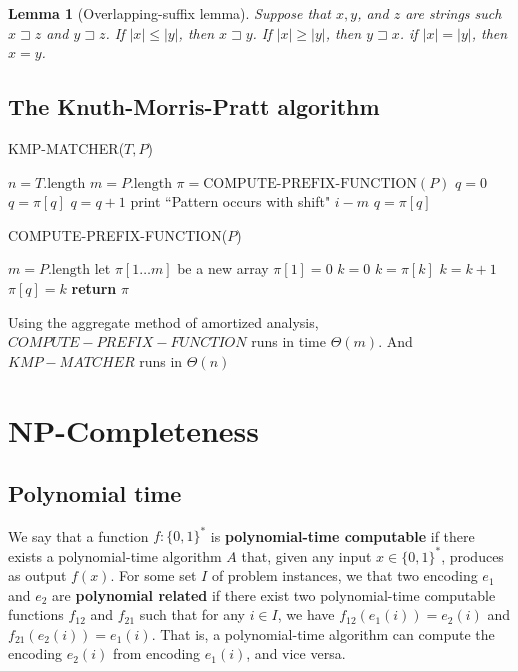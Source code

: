 \documentclass[12pt]{article}
\newtheorem{lemma}[theorem]{Lemma}
\begin{document}
\begin{lemma} [Overlapping-suffix lemma]
  Suppose that $x, y$, and $z$ are strings such $x \sqsupset z$ and $y \sqsupset z$. If $|x| \le |y|$, then $x \sqsupset y$. If $|x| \ge |y|$, then $y \sqsupset x$. if $|x| = |y|$, then $x = y$.
\end{lemma}

\subsection{The Knuth-Morris-Pratt algorithm}

KMP-MATCHER($T, P$)
\begin{algorithmic} [1]
\State $n = T.\text{length}$
\State $m = P.\text{length}$
\State $\pi = \text{COMPUTE-PREFIX-FUNCTION}(P)$
\State $q = 0$
        	\State $q = \pi [q]$
        \EndWhile
		\State $q = q + 1$
        \EndIf
		\State print ``Pattern occurs with shift" $i-m$
                \State $q = \pi [q]$
        \EndIf
\EndFor
\end{algorithmic}

COMPUTE-PREFIX-FUNCTION($P$)
\begin{algorithmic} [1]
\State $m = P.\text{length}$
\State let $\pi [1 \dots m]$ be a new array
\State $\pi [1] = 0$
\State $k = 0$
		\State $k = \pi [k]$
        \EndWhile
        	\State $k = k + 1$
        \EndIf
        \State $\pi [q] = k$
\EndFor
\State \textbf{return } $\pi$
\end{algorithmic}

Using the aggregate method of amortized analysis, $COMPUTE-PREFIX-FUNCTION$ runs in time $\Theta(m)$. And $KMP-MATCHER$ runs in $\Theta(n)$

\section{NP-Completeness}

\subsection{Polynomial time}

We say that a function $f: \{ 0,1 \}^*$ is \textbf{polynomial-time computable} if there exists a polynomial-time algorithm $A$ that, given any input $x \in \{ 0,1 \}^*$, produces as output $f(x)$. For some set $I$ of problem instances, we that two encoding $e_1$ and $e_2$ are \textbf{polynomial related} if there exist two polynomial-time computable functions $f_{12}$ and $f_{21}$ such that for any $i \in I$, we have $f_{12}(e_1(i)) = e_2(i)$ and $f_{21}(e_2(i)) = e_1(i)$. That is, a polynomial-time algorithm can compute the encoding $e_2(i)$ from encoding $e_1(i)$, and vice versa.
\end{document}
